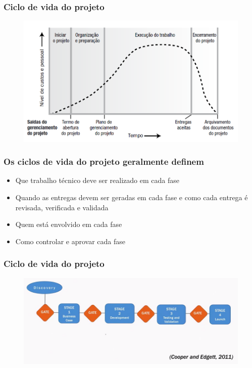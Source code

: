 \begin{frame}
 \frametitle{Ciclo de vida do projeto}
\begin{figure}
 \centering
 \includegraphics[width = \textwidth]{figs/fig22.png}
\end{figure}
\end{frame}

\begin{frame}
 \frametitle{Os ciclos de vida do projeto geralmente definem}
 \begin{itemize}
  \item Que trabalho técnico deve ser realizado em cada fase
\item Quando as entregas devem ser geradas em cada fase e como cada entrega é
revisada, verificada e validada
\item Quem está envolvido em cada fase 
\item Como controlar e aprovar cada fase
 \end{itemize}
\end{frame}

\begin{frame}
 \frametitle{Ciclo de vida do projeto}
\begin{figure}
 \centering
 \includegraphics[width = \textwidth]{figs/fig20.png}
\end{figure}
\end{frame}

